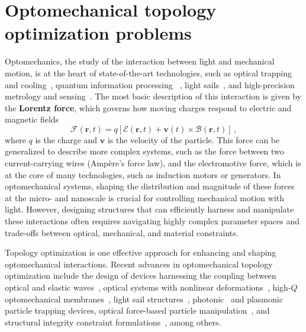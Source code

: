 \chapter{Optomechanical topology optimization problems}\label{chap:om}
Optomechanics, the study of the interaction between light and mechanical motion, is at the heart of state-of-the-art technologies, such as 
optical trapping~\cite{ashkin_acceleration_1970, moffitt_recent_2008} and cooling~\cite{cooling}, quantum information processing~\cite{Andrews_2014, Xi_2025}
, light sails~\cite{lightsail, lightsail1}, and high-precision metrology and sensing~\cite{sensing, weakforce, Li:18, Mason_2019}. The most basic description of this interaction is given by the \textbf{Lorentz force}, which governs how moving charges respond to electric and magnetic fields
\begin{equation}\label{eq:lorentz_f}
 \mathbf{\bm{\mathcal{F}}}(\mathbf{r},t) = q \left[ \bm{\mathcal{E}}(\mathbf{r},t) + \mathbf{v}(t) \times \bm{\mathcal{B}}(\mathbf{r},t) \right]\,,
\end{equation}
where $q$ is the charge and $\mathbf{v}$ is the velocity of the particle. This force can be generalized to describe more complex systems,
such as the force between two current-carrying 
wires (Ampère's force law), and the electromotive force, which is at the core of many technologies, such as induction motors or generators.
In optomechanical systems, shaping the distribution and magnitude of these forces at the micro- and nanoscale is crucial for controlling mechanical motion with light. 
However, designing structures that can efficiently harness and manipulate these interactions often requires navigating highly complex
 parameter spaces and trade-offs between optical, mechanical, and material constraints.

 Topology optimization is one effective approach for enhancing and shaping optomechanical interactions.
Recent advances in optomechanical topology optimization include the design of devices harnessing the coupling between optical and elastic
 waves~\cite{photo_topopt}, optical systems with nonlinear deformations~\cite{def_wg}, high-$Q$ optomechanical membranes~\cite{highQ1, fengwen, aragon1},
light sail structures~\cite{lightsail_topopt, lightsail_topopt1},
photonic~\cite{ownpub1} and plasmonic~\cite{nelson_inverse_2024} particle trapping devices, optical force-based particle manipulation~\cite{ownpub2, particle_opt},
and structural integrity constraint formulations~\cite{structural_integrity},
 among others.

